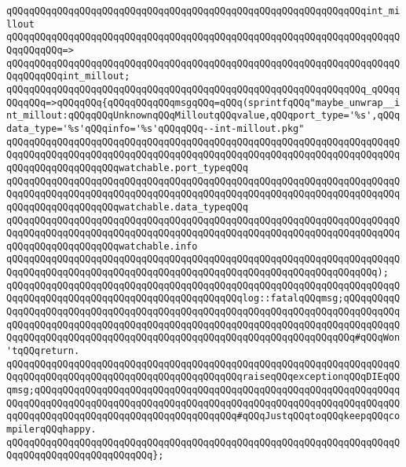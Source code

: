 \verb|qQQqqQQqqQQqqQQqqQQqqQQqqQQqqQQqqQQqqQQqqQQqqQQqqQQqqQQqqQQqqQQqint_millout|\newline
\verb|qQQqqQQqqQQqqQQqqQQqqQQqqQQqqQQqqQQqqQQqqQQqqQQqqQQqqQQqqQQqqQQqqQQqqQQqqQQqqQQq=>|\newline
\verb|qQQqqQQqqQQqqQQqqQQqqQQqqQQqqQQqqQQqqQQqqQQqqQQqqQQqqQQqqQQqqQQqqQQqqQQqqQQqqQQqint_millout;|\newline
\newline
\verb|qQQqqQQqqQQqqQQqqQQqqQQqqQQqqQQqqQQqqQQqqQQqqQQqqQQqqQQqqQQqqQQq_qQQqqQQqqQQq=>qQQqqQQq{qQQqqQQqqQQqmsgqQQq=qQQq(sprintfqQQq"maybe_unwrap__int_millout:qQQqqQQqUnknownqQQqMilloutqQQqvalue,qQQqport_type='%s',qQQqdata_type='%s'qQQqinfo='%s'qQQqqQQq--int-millout.pkg"|\newline
\verb|qQQqqQQqqQQqqQQqqQQqqQQqqQQqqQQqqQQqqQQqqQQqqQQqqQQqqQQqqQQqqQQqqQQqqQQqqQQqqQQqqQQqqQQqqQQqqQQqqQQqqQQqqQQqqQQqqQQqqQQqqQQqqQQqqQQqqQQqqQQqqQQqqQQqqQQqqQQqqQQqwatchable.port_typeqQQq|\newline
\verb|qQQqqQQqqQQqqQQqqQQqqQQqqQQqqQQqqQQqqQQqqQQqqQQqqQQqqQQqqQQqqQQqqQQqqQQqqQQqqQQqqQQqqQQqqQQqqQQqqQQqqQQqqQQqqQQqqQQqqQQqqQQqqQQqqQQqqQQqqQQqqQQqqQQqqQQqqQQqqQQqwatchable.data_typeqQQq|\newline
\verb|qQQqqQQqqQQqqQQqqQQqqQQqqQQqqQQqqQQqqQQqqQQqqQQqqQQqqQQqqQQqqQQqqQQqqQQqqQQqqQQqqQQqqQQqqQQqqQQqqQQqqQQqqQQqqQQqqQQqqQQqqQQqqQQqqQQqqQQqqQQqqQQqqQQqqQQqqQQqqQQqwatchable.info|\newline
\verb|qQQqqQQqqQQqqQQqqQQqqQQqqQQqqQQqqQQqqQQqqQQqqQQqqQQqqQQqqQQqqQQqqQQqqQQqqQQqqQQqqQQqqQQqqQQqqQQqqQQqqQQqqQQqqQQqqQQqqQQqqQQqqQQqqQQqqQQq);|\newline
\verb|qQQqqQQqqQQqqQQqqQQqqQQqqQQqqQQqqQQqqQQqqQQqqQQqqQQqqQQqqQQqqQQqqQQqqQQqqQQqqQQqqQQqqQQqqQQqqQQqqQQqqQQqqQQqqQQqlog::fatalqQQqmsg;qQQqqQQqqQQqqQQqqQQqqQQqqQQqqQQqqQQqqQQqqQQqqQQqqQQqqQQqqQQqqQQqqQQqqQQqqQQqqQQqqQQqqQQqqQQqqQQqqQQqqQQqqQQqqQQqqQQqqQQqqQQqqQQqqQQqqQQqqQQqqQQqqQQqqQQqqQQqqQQqqQQqqQQqqQQqqQQqqQQqqQQqqQQqqQQqqQQqqQQqqQQqqQQqqQQq#qQQqWon'tqQQqreturn.|\newline
\verb|qQQqqQQqqQQqqQQqqQQqqQQqqQQqqQQqqQQqqQQqqQQqqQQqqQQqqQQqqQQqqQQqqQQqqQQqqQQqqQQqqQQqqQQqqQQqqQQqqQQqqQQqqQQqqQQqraiseqQQqexceptionqQQqDIEqQQqmsg;qQQqqQQqqQQqqQQqqQQqqQQqqQQqqQQqqQQqqQQqqQQqqQQqqQQqqQQqqQQqqQQqqQQqqQQqqQQqqQQqqQQqqQQqqQQqqQQqqQQqqQQqqQQqqQQqqQQqqQQqqQQqqQQqqQQqqQQqqQQqqQQqqQQqqQQqqQQqqQQqqQQqqQQqqQQqqQQq#qQQqJustqQQqtoqQQqkeepqQQqcompilerqQQqhappy.|\newline
\verb|qQQqqQQqqQQqqQQqqQQqqQQqqQQqqQQqqQQqqQQqqQQqqQQqqQQqqQQqqQQqqQQqqQQqqQQqqQQqqQQqqQQqqQQqqQQqqQQq};|\newline
